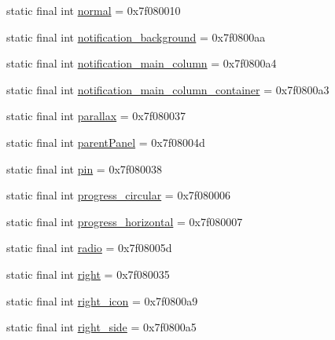 \begin{CompactItemize}
static final int \hyperlink{classandroid_1_1support_1_1graphics_1_1drawable_1_1animated_1_1_r_1_1id_faa49cec79361478bd72eb0f344107e6}{normal} = 0x7f080010
\item 
static final int \hyperlink{classandroid_1_1support_1_1graphics_1_1drawable_1_1animated_1_1_r_1_1id_178cd48cee360e8b180ba34fad481510}{notification\_\-background} = 0x7f0800aa
\item 
static final int \hyperlink{classandroid_1_1support_1_1graphics_1_1drawable_1_1animated_1_1_r_1_1id_e15349a3b5141399d96ec8d2d83643c2}{notification\_\-main\_\-column} = 0x7f0800a4
\item 
static final int \hyperlink{classandroid_1_1support_1_1graphics_1_1drawable_1_1animated_1_1_r_1_1id_4f7673cfcaedd38ebf6647146ecb4912}{notification\_\-main\_\-column\_\-container} = 0x7f0800a3
\item 
static final int \hyperlink{classandroid_1_1support_1_1graphics_1_1drawable_1_1animated_1_1_r_1_1id_f56a1bb7f17e3bf142c9a007d46be0f3}{parallax} = 0x7f080037
\item 
static final int \hyperlink{classandroid_1_1support_1_1graphics_1_1drawable_1_1animated_1_1_r_1_1id_6127e2907ca04c24049b4f5a9a024a4d}{parentPanel} = 0x7f08004d
\item 
static final int \hyperlink{classandroid_1_1support_1_1graphics_1_1drawable_1_1animated_1_1_r_1_1id_eba0a19aeb5af8ffdd3cb367ee90f927}{pin} = 0x7f080038
\item 
static final int \hyperlink{classandroid_1_1support_1_1graphics_1_1drawable_1_1animated_1_1_r_1_1id_28663997e3e8c4c80a3675e498415a83}{progress\_\-circular} = 0x7f080006
\item 
static final int \hyperlink{classandroid_1_1support_1_1graphics_1_1drawable_1_1animated_1_1_r_1_1id_e46f3f984b25ea291eaa2fbf9e753ce2}{progress\_\-horizontal} = 0x7f080007
\item 
static final int \hyperlink{classandroid_1_1support_1_1graphics_1_1drawable_1_1animated_1_1_r_1_1id_c0f64d7b30599d86b3e8225c8ad8b32f}{radio} = 0x7f08005d
\item 
static final int \hyperlink{classandroid_1_1support_1_1graphics_1_1drawable_1_1animated_1_1_r_1_1id_c797725ce3ba0a5baeb4279f48dfb991}{right} = 0x7f080035
\item 
static final int \hyperlink{classandroid_1_1support_1_1graphics_1_1drawable_1_1animated_1_1_r_1_1id_f6ba5872dced9d43d0c9f98de38eeed5}{right\_\-icon} = 0x7f0800a9
\item 
static final int \hyperlink{classandroid_1_1support_1_1graphics_1_1drawable_1_1animated_1_1_r_1_1id_54e94466e60d747e98a3052afc12b014}{right\_\-side} = 0x7f0800a5

\end{CompactItemize}

